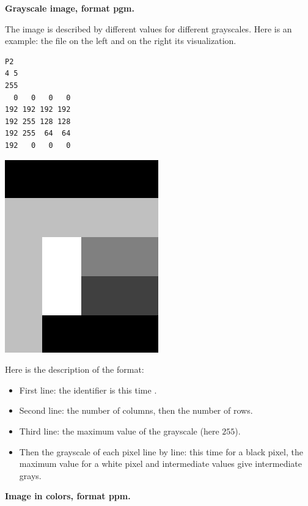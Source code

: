 \documentclass[11pt,class=report,crop=false]{standalone}
\begin{document}
\begin{cours}
\medskip

\textbf{Grayscale image, format \og{}pgm\fg{}.}

The image is described by different values for different grayscales.
Here is an example: the file  on the left and on the right its visualization.
\begin{center}
\begin{minipage}{0.3\textwidth}
\begin{lstlisting}
P2
4 5
255
  0   0   0   0
192 192 192 192
192 255 128 128
192 255  64  64
192   0   0   0
\end{lstlisting}
\end{minipage}
\begin{minipage}{0.3\textwidth}
\includegraphics[scale=\myscale,scale=0.2]{screen-lesson-image_gris}
\end{minipage}
\end{center}

Here is the description of the format:
\begin{itemize}
  \item First line: the identifier is this time .
  \item Second line: the number of columns, then the number of rows.
  \item Third line: the maximum value of the grayscale (here $255$).
  \item Then the grayscale of each pixel line by line: this time  for a black pixel, the maximum value for a white pixel and intermediate values give intermediate grays. 
\end{itemize}  

\medskip

\textbf{Image in colors, format \og{}ppm\fg{}.}



\end{cours}
\end{document}
